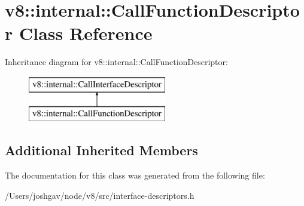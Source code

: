 \hypertarget{classv8_1_1internal_1_1_call_function_descriptor}{}\section{v8\+:\+:internal\+:\+:Call\+Function\+Descriptor Class Reference}
\label{classv8_1_1internal_1_1_call_function_descriptor}
Inheritance diagram for v8\+:\+:internal\+:\+:Call\+Function\+Descriptor\+:\begin{figure}[H]
\begin{center}
\leavevmode
\includegraphics[height=2.000000cm]{classv8_1_1internal_1_1_call_function_descriptor}
\end{center}
\end{figure}
\subsection*{Additional Inherited Members}


The documentation for this class was generated from the following file\+:\begin{DoxyCompactItemize}
\item 
/\+Users/joshgav/node/v8/src/interface-\/descriptors.\+h\end{DoxyCompactItemize}
